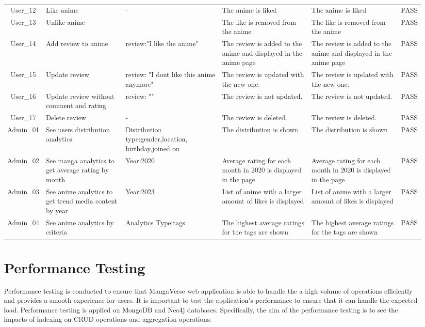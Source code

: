 \begin{longtable}{|c|>{\RaggedRight}p{2cm}|>{\RaggedRight}p{3.5cm}|>{\RaggedRight}p{3cm}|>{\RaggedRight}p{3cm}|>{\RaggedRight}p{1.5 cm}|}
    \hline
    User\_12 & Like anime & - & The anime is liked & The anime is liked  & PASS \\
    User\_13 & Unlike anime & - & The like is removed from the anime & The like is removed from the anime  & PASS \\
    \hline
    User\_14 & Add review to anime & review:"I like the anime"  & The review is added to the anime and displayed in the anime page  & The review is added to the anime and displayed in the anime page  & PASS \\
    \hline
    User\_15 & Update review & review: "I dont like this anime anymore" & The review is updated with the new one. & The review is updated with the new one.  & PASS \\
    \hline
    User\_16 & Update review without comment and rating & review: "" & The review is not updated. & The review is not updated.  & PASS \\
    \hline
    User\_17 & Delete review & - & The review is deleted. & The review is deleted.  & PASS \\
    \hline
    Admin\_01 & See users distribution analytics   & Distribution type:gender,location, birthday,joined on & The distribution is shown  & The distribution is shown  & PASS  \\
    \hline
    Admin\_02 & See manga analytics to get average rating by month & Year:2020 & Average rating for each month in 2020 is displayed in the page & Average rating for each month in 2020 is displayed in the page  & PASS  \\
    \hline
    Admin\_03 & See anime analytics to get trend media content by year & Year:2023 & List of anime with a larger amount of likes is displayed & List of anime with a larger amount of likes is displayed  & PASS  \\
    \hline
    Admin\_04 & See anime analytics by criteria  & Analytics Type:tags  & The highest average ratings for the tags are shown  & The highest average ratings for the tags are shown & PASS \\
    \hline
\end{longtable}



\section{Performance Testing}

Performance testing is conducted to ensure that MangaVerse web application is able to handle the 
a high volume of operations efficiently and provides a smooth experience for users. 
It is important to test the application's performance to ensure that it 
can handle the expected load. Performance testing is applied on MongoDB and Neo4j databases.
Specifically, the aim of the performance testing is to see the impacts of indexing on CRUD operations
and aggregation operations. 


